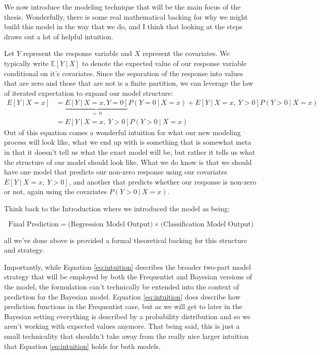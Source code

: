 \documentclass[12pt,twoside]{reedthesis}
\begin{document}
We now introduce the modeling technique that will be the main focus of the thesis. Wonderfully, there is some real mathematical backing for why we might build this model in the way that we do, and I think that looking at the steps draws out a lot of helpful intuition.

Let \(Y\) represent the response variable and \(X\) represent the covariates. We typically write \(\mathbb{E}[Y \ | \ X]\) to denote the expected value of our response variable conditional on it's covariates. Since the separation of the response into values that are zero and those that are not is a finite partition, we can leverage the law of iterated expectation to expand our model structure:
\begin{equation}
\begin{split}
    E[ Y  \ | \ X = x] &= \underbrace{E[Y \ | \ X = x, Y = 0]}_{= \ 0}P(Y = 0 \ | \ X = x) + E[Y \ | \ X = x, \ Y > 0]P(Y> 0 \ | \ X = x) \\
    &= E[Y \ | \ X = x, \ Y > 0]P(Y > 0 \ | \ X = x) 
\end{split}
\label{eq:intuition}
\end{equation}
Out of this equation comes a wonderful intuition for what our new modeling process will look like, what we end up with is something that is somewhat meta in that it doesn't tell us what the exact model will be, but rather it tells us what the structure of our model should look like. What we do know is that we should have one model that predicts our non-zero response using our covariates \(E[Y \ | \ X = x, \ Y>0]\), and another that predicts whether our response is non-zero or not, again using the covariates \(P(Y > 0 \ | \ X = x)\).

Think back to the Introduction where we introduced the model as being:

\[
\text{Final Prediction} = \bigg(\text{Regression Model Output}\bigg) \times \bigg(\text{Classification Model Output}\bigg)
\]

all we've done above is provided a formal theoretical backing for this structure and strategy.

Importantly, while Equation \eqref{eq:intuition} describes the broader two-part model strategy that will be employed by both the Frequentist and Bayesian versions of the model, the formulation can't technically be extended into the context of prediction for the Bayesian model. Equation \eqref{eq:intuition} does describe how prediction functions in the Frequentist case, but as we will get to later in the Bayesian setting everything is described by a probability distribution and so we aren't working with expected values anymore. That being said, this is just a small technicality that shouldn't take away from the really nice larger intuition that Equation \eqref{eq:intuition} holds for both models.
\end{document}
